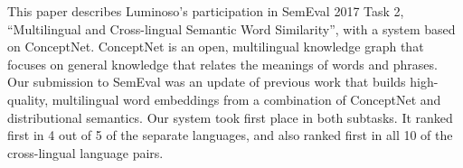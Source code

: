 This paper describes Luminoso's participation in SemEval 2017 Task 2, ``Multilingual and Cross-lingual Semantic Word Similarity'', with a system based on ConceptNet. ConceptNet is an open, multilingual knowledge graph that focuses on general knowledge that relates the meanings of words and phrases. Our submission to SemEval was an update of previous work that builds high-quality, multilingual word embeddings from a combination of ConceptNet and distributional semantics. Our system took first place in both subtasks. It ranked first in 4 out of 5 of the separate languages, and also ranked first in all 10 of the cross-lingual language pairs.
